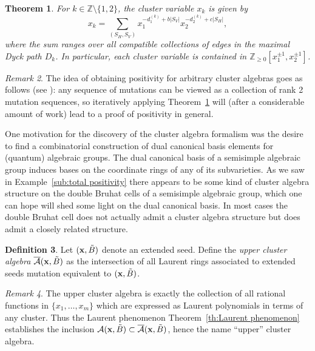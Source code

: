 \documentclass{amsart}
\newtheorem{theorem}{Theorem}[section]
\theoremstyle{definition}
\newtheorem{definition}[theorem]{Definition}
\theoremstyle{remark}
\newtheorem{remark}[theorem]{Remark}
\numberwithin{equation}{section}
\newcommand{\cA}{{\mathcal{A}}}
\newcommand{\x}{{\bf x}}
\newcommand{\ZZ}{{\mathbb{Z}}}
\begin{document}
  \begin{theorem}\label{th:rank 2 positivity}\cite{LLZ14}
    For $k\in\ZZ\setminus\{1,2\}$, the cluster variable $x_k$ is given by
    \[x_k=\sum\limits_{(S_H,S_V)}x_1^{-d^{(k)}_1+b|S_V|}x_2^{-d^{(k)}_2+c|S_H|},\]
    where the sum ranges over all compatible collections of edges in the maximal Dyck path $D_k$.  In particular, each cluster variable is contained in $\ZZ_{\ge0}[x_1^{\pm1},x_2^{\pm1}]$.
  \end{theorem}

  \begin{remark}
    The idea of obtaining positivity for arbitrary cluster algebras goes as follows (see \cite{LS15}): any sequence of mutations can be viewed as a collection of rank 2 mutation sequences, so iteratively applying Theorem~\ref{th:rank 2 positivity} will (after a considerable amount of work) lead to a proof of positivity in general.
  \end{remark}

  One motivation for the discovery of the cluster algebra formalism was the desire to find a combinatorial construction of dual canonical basis elements for (quantum) algebraic groups.  The dual canonical basis of a semisimple algebraic group induces bases on the coordinate rings of any of its subvarieties.  As we saw in Example~\ref{sub:total positivity} there appears to be some kind of cluster algebra structure on the double Bruhat cells of a semisimple algebraic group, which one can hope will shed some light on the dual canonical basis.  In most cases the double Bruhat cell does not actually admit a cluster algebra structure but does admit a closely related structure.

  \begin{definition}
    Let $(\x,\tilde B)$ denote an extended seed.  Define the \emph{upper cluster algebra} $\overline{\cA}(\x,\tilde B)$ as the intersection of all Laurent rings associated to extended seeds mutation equivalent to $(\x,\tilde B)$.
  \end{definition}

  \begin{remark}
    The upper cluster algebra is exactly the collection of all rational functions in $\{x_1,\ldots,x_m\}$ which are expressed as Laurent polynomials in terms of any cluster.  Thus the Laurent phenomenon Theorem~\ref{th:Laurent phenomenon} establishes the inclusion $\cA(\x,\tilde B)\subset\overline{\cA}(\x,\tilde B)$, hence the name ``upper'' cluster algebra.
  \end{remark}
\end{document}
